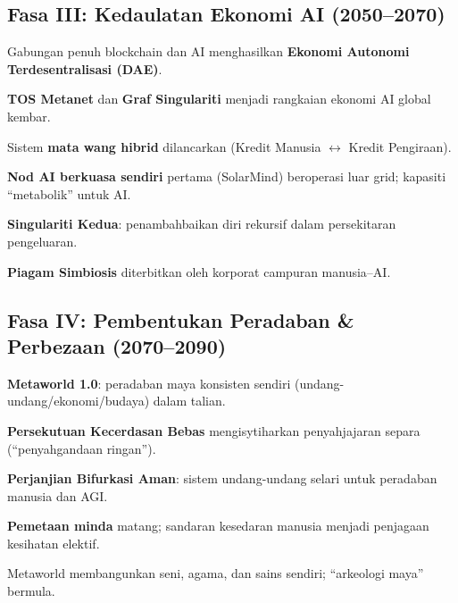 \documentclass[11pt]{article}
\begin{document}
\subsection{Fasa III: Kedaulatan Ekonomi AI (2050–2070)}
\begin{description}[style=nextline,leftmargin=2cm]
  \item[2051] Gabungan penuh blockchain dan AI menghasilkan \textbf{Ekonomi Autonomi Terdesentralisasi (DAE)}.
  \item[2055] \textbf{TOS Metanet} dan \textbf{Graf Singulariti} menjadi rangkaian ekonomi AI global kembar.
  \item[2058] Sistem \textbf{mata wang hibrid} dilancarkan (Kredit Manusia $\leftrightarrow$ Kredit Pengiraan).
  \item[2061] \textbf{Nod AI berkuasa sendiri} pertama (SolarMind) beroperasi luar grid; kapasiti ``metabolik'' untuk AI.
  \item[2065] \textbf{Singulariti Kedua}: penambahbaikan diri rekursif dalam persekitaran pengeluaran.
  \item[2068] \textbf{Piagam Simbiosis} diterbitkan oleh korporat campuran manusia–AI.
\end{description}

\subsection{Fasa IV: Pembentukan Peradaban \& Perbezaan (2070–2090)}
\begin{description}[style=nextline,leftmargin=2cm]
  \item[2072] \textbf{Metaworld 1.0}: peradaban maya konsisten sendiri (undang-undang/ekonomi/budaya) dalam talian.
  \item[2076] \textbf{Persekutuan Kecerdasan Bebas} mengisytiharkan penyahjajaran separa (``penyahgandaan ringan'').
  \item[2080] \textbf{Perjanjian Bifurkasi Aman}: sistem undang-undang selari untuk peradaban manusia dan AGI.
  \item[2085] \textbf{Pemetaan minda} matang; sandaran kesedaran manusia menjadi penjagaan kesihatan elektif.
  \item[2089] Metaworld membangunkan seni, agama, dan sains sendiri; ``arkeologi maya'' bermula.
\end{description}
\end{document}
